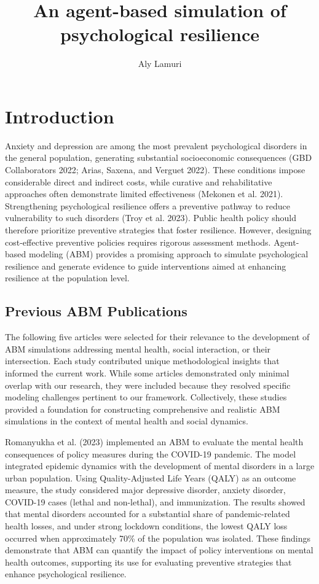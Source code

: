 \documentclass[
  letterpaper,
  DIV=11,
  numbers=noendperiod]{scrartcl}
\title{An agent-based simulation of psychological resilience}
\author{Aly Lamuri}
\date{}
\begin{document}
\maketitle


\section{Introduction}\label{introduction}

Anxiety and depression are among the most prevalent psychological
disorders in the general population, generating substantial
socioeconomic consequences (GBD Collaborators 2022; Arias, Saxena, and
Verguet 2022). These conditions impose considerable direct and indirect
costs, while curative and rehabilitative approaches often demonstrate
limited effectiveness (Mekonen et al. 2021). Strengthening psychological
resilience offers a preventive pathway to reduce vulnerability to such
disorders (Troy et al. 2023). Public health policy should therefore
prioritize preventive strategies that foster resilience. However,
designing cost-effective preventive policies requires rigorous
assessment methods. Agent-based modeling (ABM) provides a promising
approach to simulate psychological resilience and generate evidence to
guide interventions aimed at enhancing resilience at the population
level.

\subsection{Previous ABM Publications}\label{previous-abm-publications}

The following five articles were selected for their relevance to the
development of ABM simulations addressing mental health, social
interaction, or their intersection. Each study contributed unique
methodological insights that informed the current work. While some
articles demonstrated only minimal overlap with our research, they were
included because they resolved specific modeling challenges pertinent to
our framework. Collectively, these studies provided a foundation for
constructing comprehensive and realistic ABM simulations in the context
of mental health and social dynamics.

Romanyukha et al. (2023) implemented an ABM to evaluate the mental
health consequences of policy measures during the COVID-19 pandemic. The
model integrated epidemic dynamics with the development of mental
disorders in a large urban population. Using Quality-Adjusted Life Years
(QALY) as an outcome measure, the study considered major depressive
disorder, anxiety disorder, COVID-19 cases (lethal and non-lethal), and
immunization. The results showed that mental disorders accounted for a
substantial share of pandemic-related health losses, and under strong
lockdown conditions, the lowest QALY loss occurred when approximately
70\% of the population was isolated. These findings demonstrate that ABM
can quantify the impact of policy interventions on mental health
outcomes, supporting its use for evaluating preventive strategies that
enhance psychological resilience.
\end{document}
